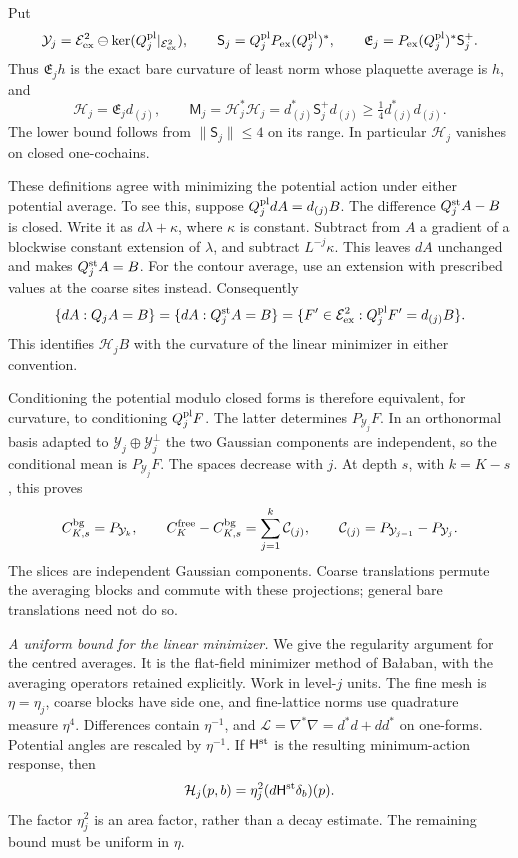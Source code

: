 \documentclass[11pt,letterpaper,reqno]{amsart}
\theoremstyle{definition}
\theoremstyle{remark}
\begin{document}
Put
\[
 \mathcal Y_j=\mathcal E^2_{\rm ex}
             \ominus\ker(Q_j^{\rm pl}|_{\mathcal E^2_{\rm ex}}),
 \qquad
 \mathsf S_j=Q_j^{\rm pl}P_{\rm ex}(Q_j^{\rm pl})^*,
 \qquad
 \mathfrak E_j=P_{\rm ex}(Q_j^{\rm pl})^*\mathsf S_j^+.
\]
Thus $\mathfrak E_jh$ is the exact bare curvature of least norm
whose plaquette average is $h$, and
\[
 \mathcal H_j=\mathfrak E_jd_{(j)},\qquad
 \mathsf M_j=\mathcal H_j^*\mathcal H_j
            =d_{(j)}^*\mathsf S_j^+d_{(j)}
            \ge\tfrac14d_{(j)}^*d_{(j)}.
\]
The lower bound follows from $\|\mathsf S_j\|\le4$ on its range.
In particular $\mathcal H_j$ vanishes on closed one-cochains.

These definitions agree with minimizing the potential action
under either potential average. To see this, suppose
$Q_j^{\rm pl}dA=d_{(j)}B$. The difference
$Q_j^{\rm st}A-B$ is closed. Write it as $d\lambda+\kappa$,
where $\kappa$ is constant. Subtract from $A$ a gradient of a
blockwise constant extension of $\lambda$, and subtract
$L^{-j}\kappa$. This leaves $dA$ unchanged and makes
$Q_j^{\rm st}A=B$. For the contour average, use an extension
with prescribed values at the coarse sites instead. Consequently
\[
 \{dA:Q_jA=B\}=\{dA:Q_j^{\rm st}A=B\}
 =\{F'\in\mathcal E^2_{\rm ex}:
                              Q_j^{\rm pl}F'=d_{(j)}B\}.
\]
This identifies $\mathcal H_jB$ with the curvature of the linear
minimizer in either convention.

Conditioning the potential modulo closed forms is therefore
equivalent, for curvature, to conditioning $Q_j^{\rm pl}F$.
The latter determines $P_{\mathcal Y_j}F$. In an orthonormal
basis adapted to $\mathcal Y_j\oplus\mathcal Y_j^\perp$ the two
Gaussian components are independent, so the conditional mean is
$P_{\mathcal Y_j}F$. The spaces decrease with $j$. At depth $s$,
with $k=K-s$, this proves
\[
 C_{K,s}^{\rm bg}=P_{\mathcal Y_k},\qquad
 C_K^{\rm free}-C_{K,s}^{\rm bg}
   =\sum_{j=1}^{k}\mathcal C_{(j)},\qquad
 \mathcal C_{(j)}=P_{\mathcal Y_{j-1}}-P_{\mathcal Y_j}.
\]
The slices are independent Gaussian components. Coarse translations
permute the averaging blocks and commute with these projections;
general bare translations need not do so.

\emph{A uniform bound for the linear minimizer.}
We give the regularity argument for the centred averages. It is
the flat-field minimizer method of Ba\l aban\cite{Balaban1984},
with the averaging operators retained explicitly. Work in level-$j$
units. The fine mesh is $\eta=\eta_j$, coarse blocks have side one,
and fine-lattice norms use quadrature measure $\eta^4$. Differences
contain $\eta^{-1}$, and
$\mathcal L=\nabla^*\nabla=d^*d+dd^*$ on one-forms. Potential
angles are rescaled by $\eta^{-1}$. If $\mathsf H^{\rm st}$ is
the resulting minimum-action response, then
\[
 \mathcal H_j(p,b)=\eta_j^2
                    (d\mathsf H^{\rm st}\delta_b)(p).
\]
The factor $\eta_j^2$ is an area factor, rather than a decay
estimate. The remaining bound must be uniform in $\eta$.
\end{document}
